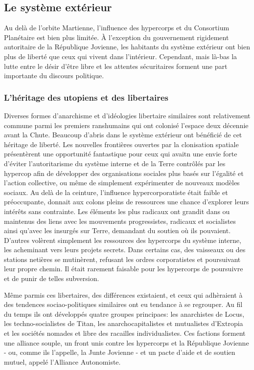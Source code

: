                \subsection{Le système extérieur} \label{sec:outer-system} 

               Au delà de l'orbite Martienne, l'influence des hypercorps et du Consortium Planétaire est bien plus limitée. À l'exception du gouvernement rigidement autoritaire de la République Jovienne, les habitants du système extérieur ont bien plus de liberté que ceux qui vivent dans l'intérieur. Cependant, mais là-bas la lutte entre le désir d'être libre et les attentes sécuritaires forment une part importante du discours politique. 

               \subsubsection{L'héritage des utopiens et des libertaires} \label{sec:libert-utop-legac} 

               Diverses formes d'anarchisme et d'idéologies libertaire similaires sont relativement commune parmi les premiers ranshumains qui ont colonisé l'espace deux décennie avant la Chute. Beaucoup d'abris dans le système extérieur ont bénéficié de cet héritage de liberté. Les nouvelles frontières ouvertes par la clonisation spatiale présentèrent une opportunité fantastique pour ceux qui avaitn une envie forte d'éviter l'autoritarisme du système interne et de la Terre contrôlés par les hypercop afin de développer des organisations sociales plus basés sur l'égalité et l'action collective, ou même de simplement expérimenter de nouveaux modèles sociaux. Au delà de la ceinture, l'influence hypercorporatiste était faible et préoccupante, donnait aux colons pleins de ressources  une chance d'explorer leurs intérêts sans contrainte. Les éléments les plus radicaux ont grandit dans ou maintenus des liens avec les mouvements progressistes, radicaux et socialistes ainsi qu'avec les insurgés sur Terre, demandant du soutien où ils pouvaient. D'autres volèrent simplement les ressources des hypercorps du système interne, les acheminant vers leurs projets secrets. Dans certains cas, des vaisseaux ou des stations netières se mutinèrent, refusant les ordres corporatistes et poursuivant leur propre chemin. Il était rarement faisable pour les hypercorps de poursuivre et de punir de telles subversion. 

               Même parmis ces libertaires, des différences existaient, et ceux qui adhèraient à des tendences sociao-politiques similaires ont eu tendance à se regrouper. Au fil du temps ils ont développés quatre groupes principaes: les anarchistes de Locus, les techno-socialistes de Titan, les anarchocapitalistes et mutualistes d'Extropia et les sociétés nomades et libre des racailles individualistes. Ces factions forment une alliance souple, un front unis contre les hypercorps et la République Jovienne - ou, comme ils l'appelle, la Junte Jovienne - et un pacte d'aide et de soutien mutuel, appelé l'Alliance Autonomiste. 

